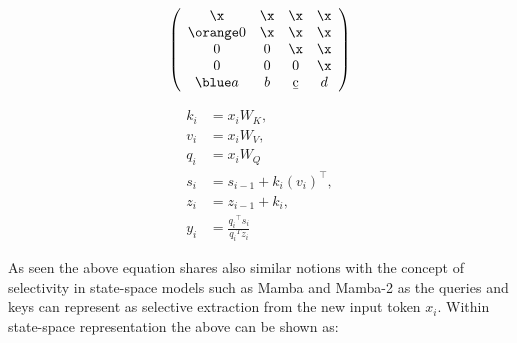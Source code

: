 \begin{equation}\label{eq:appendrow}
  \left(\begin{array}{cccc}
    \x  & \x  & \x & \x \\
    \orange 0   & \x  & \x & \x \\
    0   & 0   & \x & \x \\
    0   & 0   & 0  & \x \\
    \blue a  &  b  & \b c &  d\\
  \end{array}\right)
\end{equation}

\begin{align*}
    k_i &= x_i W_K,  \\
    v_i &= x_i W_V,   \\
    q_i &= x_i W_Q \\
    s_i &= s_{i-1} + {k_i} \left(v_i\right)^{\top}, \\
    z_i &= z_{i-1} + k_i, \\
    y_i &= \frac{{q_i}^{\top} s_i}{{q_i}^T z_i} 
\end{align*}

As seen the above equation shares also similar notions with the concept of selectivity in state-space models such as Mamba \cite{mamba} and Mamba-2 \cite{mamba2} as the queries and keys can represent as selective extraction from the new input token $x_i$. Within state-space representation the above can be shown as: 


